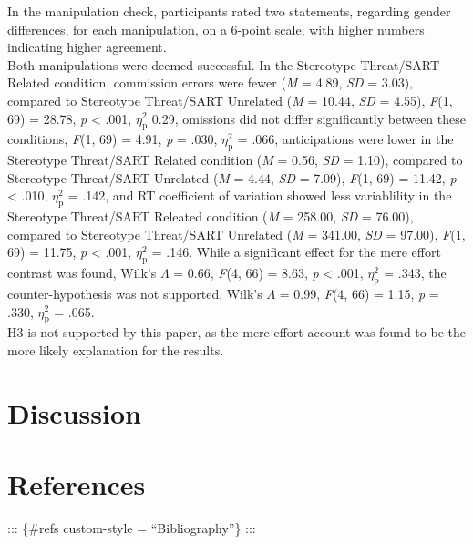 \documentclass[
  stu,floatsintext]{apa7}
\begin{document}
In the manipulation check, participants rated two statements, regarding gender differences, for each manipulation, on a 6-point scale, with higher numbers indicating higher agreement.\\
Both manipulations were deemed successful.
In the Stereotype Threat/SART Related condition, commission errors were fewer (\emph{M} = 4.89, \emph{SD} = 3.03), compared to Stereotype Threat/SART Unrelated (\emph{M} = 10.44, \emph{SD} = 4.55), \emph{F}(1, 69) = 28.78, \emph{p} \textless{} .001, \(\eta^{2}_{\text{p}}\) 0.29, omissions did not differ significantly between these conditions, \emph{F}(1, 69) = 4.91, \emph{p} = .030, \(\eta^{2}_{\text{p}}\) = .066, anticipations were lower in the Stereotype Threat/SART Related condition (\emph{M} = 0.56, \emph{SD} = 1.10), compared to Stereotype Threat/SART Unrelated (\emph{M} = 4.44, \emph{SD} = 7.09), \emph{F}(1, 69) = 11.42, \emph{p} \textless{} .010, \(\eta^{2}_{\text{p}}\) = .142, and RT coefficient of variation showed less variablility in the Stereotype Threat/SART Releated condition (\emph{M} = 258.00, \emph{SD} = 76.00), compared to Stereotype Threat/SART Unrelated (\emph{M} = 341.00, \emph{SD} = 97.00), \emph{F}(1, 69) = 11.75, \emph{p} \textless{} .001, \(\eta^{2}_{\text{p}}\) = .146.
While a significant effect for the mere effort contrast was found, Wilk's \(\Lambda\) = 0.66, \emph{F}(4, 66) = 8.63, \emph{p} \textless{} .001, \(\eta^{2}_{\text{p}}\) = .343, the counter-hypothesis was not supported, Wilk's \(\Lambda\) = 0.99, \emph{F}(4, 66) = 1.15, \emph{p} = .330, \(\eta^{2}_{\text{p}}\) = .065.\\
H3 is not supported by this paper, as the mere effort account was found to be the more likely explanation for the results.

\section{Discussion}\label{discussion}

\newpage

\section{References}\label{references}

::: \{\#refs custom-style = ``Bibliography''\}
:::
\end{document}
